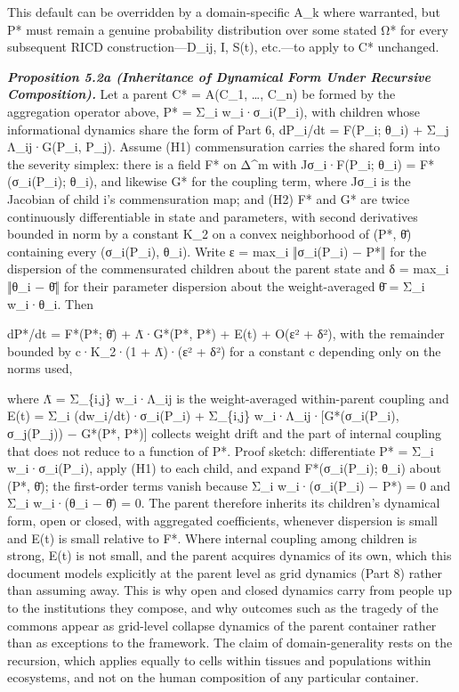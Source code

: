 \documentclass[
]{article}
\begin{document}
This default can be overridden by a domain-specific A\_k where
warranted, but P* must remain a genuine probability distribution over
some stated Ω* for every subsequent RICD construction---D\_ij, I, S(t),
etc.---to apply to C* unchanged.

\emph{\textbf{Proposition 5.2a (Inheritance of Dynamical Form Under
Recursive Composition).}} Let a parent C* = A(C\_1, \ldots, C\_n) be
formed by the aggregation operator above, P* = Σ\_i w\_i·σ\_i(P\_i),
with children whose informational dynamics share the form of Part 6,
dP\_i/dt = F(P\_i; θ\_i) + Σ\_j Λ\_ij·G(P\_i, P\_j). Assume (H1)
commensuration carries the shared form into the severity simplex: there
is a field F* on Δ\^{}m with Jσ\_i·F(P\_i; θ\_i) = F*(σ\_i(P\_i); θ\_i),
and likewise G* for the coupling term, where Jσ\_i is the Jacobian of
child i's commensuration map; and (H2) F* and G* are twice continuously
differentiable in state and parameters, with second derivatives bounded
in norm by a constant K\_2 on a convex neighborhood of (P*, θ̄)
containing every (σ\_i(P\_i), θ\_i). Write ε = max\_i ‖σ\_i(P\_i) − P*‖
for the dispersion of the commensurated children about the parent state
and δ = max\_i ‖θ\_i − θ̄‖ for their parameter dispersion about the
weight-averaged θ̄ = Σ\_i w\_i·θ\_i. Then

dP*/dt = F*(P*; θ̄) + Λ̄·G*(P*, P*) + E(t) + O(ε² + δ²), with the
remainder bounded by c·K\_2·(1 + Λ̄)·(ε² + δ²) for a constant c depending
only on the norms used,

where Λ̄ = Σ\_\{i,j\} w\_i·Λ\_ij is the weight-averaged within-parent
coupling and E(t) = Σ\_i (dw\_i/dt)·σ\_i(P\_i) + Σ\_\{i,j\}
w\_i·Λ\_ij·{[}G*(σ\_i(P\_i), σ\_j(P\_j)) − G*(P*, P*){]} collects weight
drift and the part of internal coupling that does not reduce to a
function of P*. Proof sketch: differentiate P* = Σ\_i w\_i·σ\_i(P\_i),
apply (H1) to each child, and expand F*(σ\_i(P\_i); θ\_i) about (P*, θ̄);
the first-order terms vanish because Σ\_i w\_i·(σ\_i(P\_i) − P*) = 0 and
Σ\_i w\_i·(θ\_i − θ̄) = 0. The parent therefore inherits its children's
dynamical form, open or closed, with aggregated coefficients, whenever
dispersion is small and E(t) is small relative to F*. Where internal
coupling among children is strong, E(t) is not small, and the parent
acquires dynamics of its own, which this document models explicitly at
the parent level as grid dynamics (Part 8) rather than assuming away.
This is why open and closed dynamics carry from people up to the
institutions they compose, and why outcomes such as the tragedy of the
commons appear as grid-level collapse dynamics of the parent container
rather than as exceptions to the framework. The claim of
domain-generality rests on the recursion, which applies equally to cells
within tissues and populations within ecosystems, and not on the human
composition of any particular container.
\end{document}
